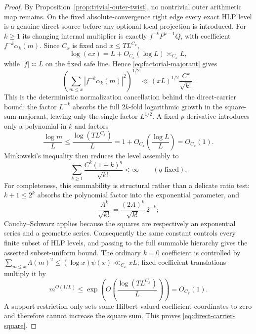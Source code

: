 \begin{proof}
By Proposition~\ref{prop:trivial-outer-twist}, no nontrivial outer arithmetic
map remains.  On the fixed absolute-convergence right edge every exact HLP
level is a genuine direct source before any optional local projection is
introduced. For $k\ge1$ its changing internal multiplier is exactly
$f^{-k}P^{k-1}Q$, with coefficient $f^{-k}\alpha_k(m)$. Since $C_x$ is fixed and $x\le T L^{C_x}$,
\[
\log(ex)=L+O_{C_x}(\log L)\asymp_{C_x}L,
\]
while $|f|\asymp L$ on the fixed safe line. Hence
\eqref{eq:factorial-majorant} gives
\[
\left(\sum_{m\le x}|f^{-k}\alpha_k(m)|^2\right)^{1/2}
\ll (xL)^{1/2}\frac{C^k}{\sqrt{k!}}.
\]
This is the deterministic normalization cancellation behind the direct-carrier
bound: the factor $L^{-k}$ absorbs the full $2k$-fold logarithmic growth in the
square-sum majorant, leaving only the single factor $L^{1/2}$.  A fixed $p$-derivative introduces only a polynomial in $k$ and factors
\[
\frac{\log m}{L}\le \frac{\log(TL^{C_x})}{L}=1+O_{C_x}\!\left(\frac{\log L}{L}\right)=O_{C_x}(1).
\]
Minkowski's inequality then reduces the level assembly to
\[
\sum_{k\ge1}\frac{C^k(1+k)^q}{\sqrt{k!}}<\infty
\qquad(q\text{ fixed}).
\]
For completeness, this summability is structural rather than a delicate ratio
test: $k+1\le2^k$ absorbs the polynomial factor into the exponential parameter,
and
\[
\frac{A^k}{\sqrt{k!}}
=\frac{(2A)^k}{\sqrt{k!}}\,2^{-k};
\]
Cauchy--Schwarz applies because the squares are respectively an exponential
series and a geometric series.  Consequently the same constant controls every
finite subset of HLP levels, and passing to the full summable hierarchy gives
the asserted subset-uniform bound. The ordinary $k=0$ coefficient is controlled by
$\sum_{m\le x}\Lambda(m)^2\le (\log x)\psi(x)\ll_{C_x} xL$; fixed coefficient
translations multiply it by
\[
m^{O(1/L)}\le \exp\!\left(O\!\left(\frac{\log(TL^{C_x})}{L}\right)\right)=O_{C_x}(1).
\]
A support restriction only sets
some Hilbert-valued coefficient coordinates to zero and therefore cannot
increase the square sum. This proves \eqref{eq:direct-carrier-square}.
\end{proof}

